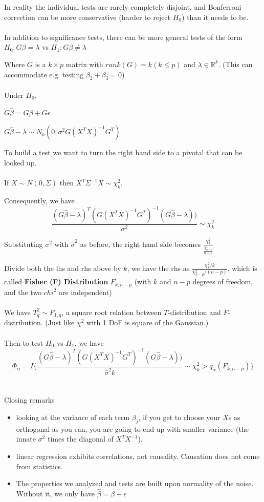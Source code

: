 \documentclass{article}
\begin{document}
In reality the individual tests are rarely completely disjoint, and Bonferroni correction can be more conservative (harder to reject $H_0$) than it needs to be.
\\
\\

In addition to significance tests, there can be more general tests of the form
$H_0: G \beta = \lambda$ vs $H_1: G \beta \neq \lambda$

Where $G$ is a $k \times p$ matrix with $rank(G) = k (k \leq p)$ and $\lambda \in \mathbb{R}^k$.
(This can accommodate e.g. testing $\beta_2 + \beta_3 = 0$)
\\
\\
Under $H_0$,

$G \hat{\beta} = G \beta + G \epsilon$ 

$G \hat{\beta} - \lambda \sim \mathit{N}_k(0, \sigma^2 G (X^T X)^{-1} G^T)$

To build a test we want to turn the right hand side to a pivotal that can be looked up.
\\
\\
If $X \sim \mathit{N}(0, \Sigma)$ then $X^T \Sigma^{-1} X \sim \chi^2_{k}$.

Consequently, we have
$$
\frac{(G \hat{\beta} - \lambda)^T (G (X^T X)^{-1} G^T)^{-1} (G \hat{\beta} - \lambda))}{\sigma^2} \sim \chi^2_k
$$

Substituting $\sigma^2$ with $\hat{\sigma}^2$ as before, the right hand side becomes $\frac{\chi^2_k}{\frac{\chi^2_{n - p}}{n - p}}$

Divide both the lhs and rhs above by $k$,
we have the rhs as $\frac{\chi^2_k / k}{\chi^2_{n - p} / (n - p)}$, which is called
\textbf{Fisher (F) Distribution} $F_{k, n-p}$ (with $k$ and $n - p$ degrees of freedom, and the two $chi^2$ are independent)
\\
\\
We have $T_q^2 \sim F_{1, q}$, a square root relation between $T$-distribution and $F$-distribution. (Just like $\chi^2$ with 1 DoF is square of the Gaussian.)
\\
\\
Then to test $H_0$ vs $H_1$, we have
$$
\Phi_{\alpha} = \mathit{I}\{\frac{(G \hat{\beta} - \lambda)^T (G (X^T X)^{-1} G^T)^{-1} (G \hat{\beta} - \lambda))}{\hat{\sigma}^2 k} \sim \chi^2_k > q_{\alpha}(F_{k, n - p})\}
$$
\\
\\

Closing remarks
\begin{itemize}
  \item looking at the variance of each term $\beta_j$, if you get to choose your $X$s as orthogonal as you can,
  you are going to end up with smaller variance (the innate $\sigma^2$ times the diagonal of $X^T X^{-1}$).
  \item linear regression exhibits correlations, not causality. Causation does not come from statistics.
  \item The properties we analyzed and tests are built upon normality of the noise. Without it, we only have $\hat{\beta} = \beta + \epsilon$
\end{itemize}
\end{document}
